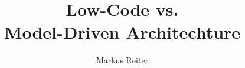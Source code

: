 \usepackage{lmodern}
\usepackage[english]{babel}

\usepackage{fontspec}

\usepackage{multicol}

\usepackage{listings}

\usepackage{datetime}
\setdefaultdate{\usdate}

\usepackage{graphicx}
\graphicspath{{assets/}}

\newcommand{\german}[1]{{#1}}

\title{Low-Code vs.\texorpdfstring{\\}{} Model-Driven Architechture}
\author{Markus Reiter}
